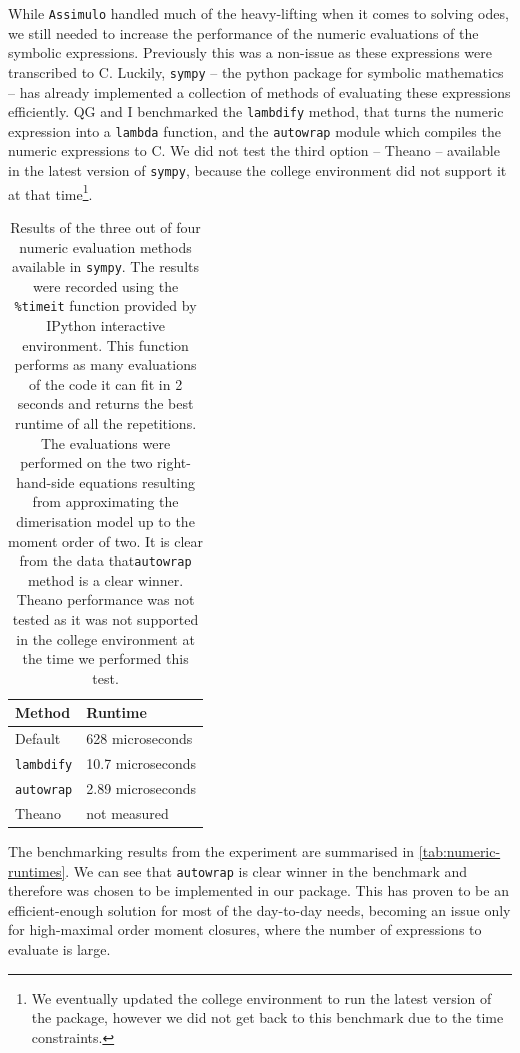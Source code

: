 While \verb"Assimulo" handled much of the heavy-lifting when it comes to solving \glspl{ode}, we still needed to increase the performance of the numeric evaluations of the symbolic expressions. 
Previously this was a non-issue as these expressions were transcribed to C. 
Luckily, \verb"sympy" -- the python package for symbolic mathematics -- has already implemented a collection of methods of evaluating these expressions efficiently. QG and I benchmarked the \verb"lambdify" method, that turns the numeric expression into a \verb"lambda" function, and the  \verb"autowrap" module which compiles the numeric expressions to C.
We did not test the third option -- Theano\cite{bergstra_theano:_2010} -- available in the latest version of \verb"sympy", because the college environment did not support it at that time\footnote{We eventually updated the college environment to run the latest version of the package, however we did not get back to this benchmark due to the time constraints.}.

\begin{table}
    \centering
    \begin{tabular}{l|l}
    Method & Runtime \\
    \hline
    Default & 628 microseconds \\
    \verb"lambdify" & 10.7 microseconds \\
    \verb"autowrap" & 2.89 microseconds \\
    Theano & not measured \\
    \end{tabular}
    \caption{Results of the three out of four numeric evaluation methods available in {\tt sympy}. 
    The results were recorded using the {\tt \%timeit} 
    function provided by IPython\cite{perez_ipython:_2007} interactive environment. 
    This function performs as many evaluations of the code it can fit in 2 seconds and returns the best runtime of all the repetitions.
    The evaluations were performed on the two right-hand-side equations resulting from approximating the dimerisation model up to the moment order of two.
    It is clear from the data that{\tt autowrap} method is a clear winner. 
    Theano performance was not tested as it was not supported in the college environment at the time we performed this test.}
    \label{tab:numeric-runtimes}
\end{table}

The benchmarking results from the experiment are summarised in \autoref{tab:numeric-runtimes}. 
We can see that \verb"autowrap" is clear winner in the benchmark and therefore was chosen to be implemented in our package.
This has proven to be an efficient-enough solution for most of the day-to-day needs, becoming an issue only for high-maximal order moment closures, where the number of expressions to evaluate is large.

